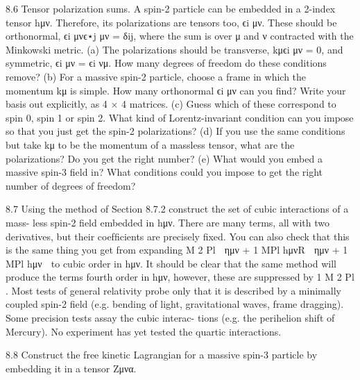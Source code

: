 8.6 Tensor polarization sums. A spin-2 particle can be embedded in a 2-index tensor
hμν. Therefore, its polarizations are tensors too, ϵi
μν. These should be orthonormal,
ϵi
μνϵ⋆j
μν = δij, where the sum is over μ and ν contracted with the Minkowski metric.
(a) The polarizations should be transverse, kμϵi
μν = 0, and symmetric, ϵi
μν = ϵi
νμ.
How many degrees of freedom do these conditions remove?
(b) For a massive spin-2 particle, choose a frame in which the momentum kμ
is simple. How many orthonormal ϵi
μν can you ﬁnd? Write your basis out
explicitly, as 4 × 4 matrices.
(c) Guess which of these correspond to spin 0, spin 1 or spin 2. What kind of
Lorentz-invariant condition can you impose so that you just get the spin-2
polarizations?
(d) If you use the same conditions but take kμ to be the momentum of a massless
tensor, what are the polarizations? Do you get the right number?
(e) What would you embed a massive spin-3 ﬁeld in? What conditions could you
impose to get the right number of degrees of freedom?

8.7 Using the method of Section 8.7.2 construct the set of cubic interactions of a mass-
less spin-2 ﬁeld embedded in hμν. There are many terms, all with two derivatives,
but their coefﬁcients are precisely ﬁxed. You can also check that this is the same
thing you get from expanding M 2
Pl

ημν +
1
MPl hμνR

ημν +
1
MPl hμν

to cubic
order in hμν.
It should be clear that the same method will produce the terms fourth order in
hμν, however, these are suppressed by
1
M 2
Pl . Most tests of general relativity probe
only that it is described by a minimally coupled spin-2 ﬁeld (e.g. bending of light,
gravitational waves, frame dragging). Some precision tests assay the cubic interac-
tions (e.g. the perihelion shift of Mercury). No experiment has yet tested the quartic
interactions.

8.8 Construct the free kinetic Lagrangian for a massive spin-3 particle by embedding it
in a tensor Zμνα.

